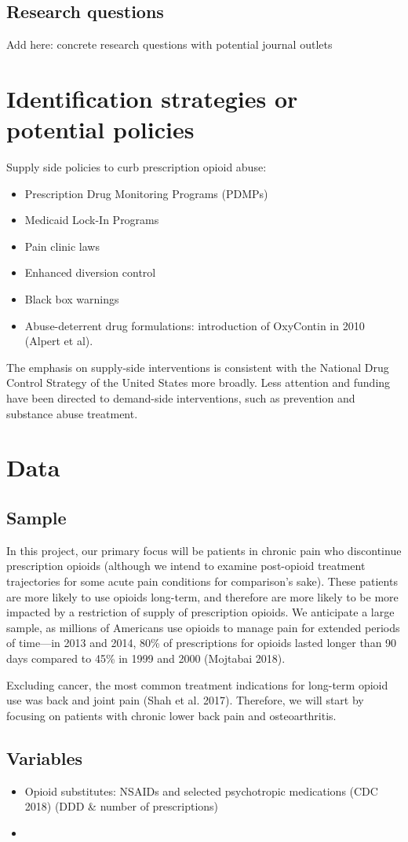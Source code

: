 \documentclass[10pt]{article}
\begin{document}
\subsection{Research questions}
Add here: concrete research questions with potential journal outlets
\section{Identification strategies or potential policies}
Supply side policies to curb prescription opioid abuse:
\begin{itemize}
\item Prescription Drug Monitoring Programs (PDMPs)
\item Medicaid Lock-In Programs
\item Pain clinic laws
\item Enhanced diversion control
\item Black box warnings
\item Abuse-deterrent drug formulations: introduction of OxyContin in 2010 (Alpert et al). 
\end{itemize}
The emphasis on supply-side interventions is consistent with the National Drug Control Strategy of the United States more broadly. 
Less attention and funding have been directed to demand-side interventions, such as prevention and substance abuse treatment.




\section{Data}

\subsection{Sample}
In this project, our primary focus will be patients in chronic pain who discontinue prescription opioids (although we intend to examine post-opioid treatment trajectories for some acute pain conditions for comparison’s sake). These patients are more likely to use opioids long-term, and therefore are more likely to be more impacted by a restriction of supply of prescription opioids. We anticipate a large sample, as millions of Americans use opioids to manage pain for extended periods of time—in 2013 and 2014, 80\% of prescriptions for opioids lasted longer than 90 days compared to 45\% in 1999 and 2000 (Mojtabai 2018). 

Excluding cancer, the most common treatment indications for long-term opioid use was back and joint pain (Shah et al. 2017). Therefore, we will start by focusing on patients with chronic lower back pain and osteoarthritis.

\subsection{Variables}

\begin{itemize}
\item Opioid substitutes: NSAIDs and selected psychotropic medications (CDC 2018) (DDD \& number of prescriptions)
\item 
\end{itemize}
\end{document}
